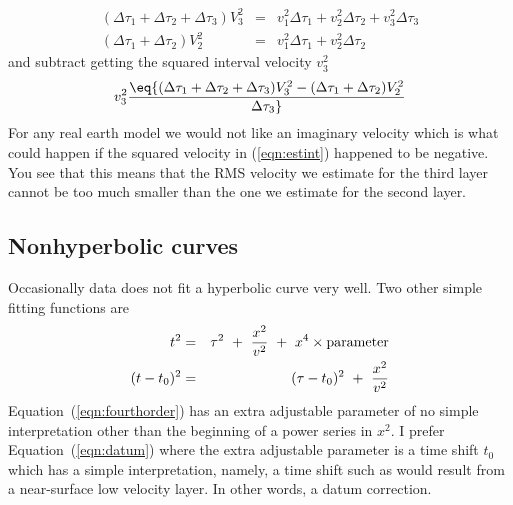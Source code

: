 \begin{eqnarray}
\label{eqn:next3}
                                    (\Delta\tau_1 + \Delta\tau_2 +\Delta\tau_3)
V_3^2 &=& v_1^2\Delta\tau_1+ v_2^2\Delta\tau_2 +v_3^2\Delta\tau_3  
\\
\label{eqn:next2}
                                    (\Delta\tau_1 + \Delta\tau_2)
V_2^2 &=& v_1^2\Delta\tau_1+ v_2^2\Delta\tau_2 
\end{eqnarray}
and subtract getting the squared interval velocity $v_3^2$
\begin{equation}
v_3^2 \eq {
        (\Delta\tau_1 + \Delta\tau_2 +\Delta\tau_3) V_3^2  -
        (\Delta\tau_1 + \Delta\tau_2              ) V_2^2
        \over
        \Delta\tau_3}
\label{eqn:estint}
\end{equation}
For any real earth model we would not like an imaginary velocity
which is what could happen if the squared velocity in (\ref{eqn:estint})
happened to be negative.
You see that this means that the RMS velocity we estimate
for the third layer cannot be too much smaller than the one we
estimate for the second layer.

\par

\subsection{Nonhyperbolic curves}
Occasionally data does not fit a hyperbolic curve very well.
Two other simple fitting functions are
\begin{eqnarray}
\label{eqn:fourthorder}
t^2              &=& \tau^2 \ +\ { x^2   \over  v^2 } \ 
                                                +\ x^4 \times {\rm parameter}
\\
\label{eqn:datum}
(t-t_0)^2        &=& (\tau-t_0)^2 \ +\ { x^2   \over  v^2 } 
\end{eqnarray}
Equation~(\ref{eqn:fourthorder}) has an extra adjustable parameter
of no simple interpretation other than the beginning of a power series in $x^2$.
I prefer Equation~(\ref{eqn:datum}) where the extra adjustable parameter
is a time shift $t_0$ which has a simple interpretation,
namely, a time shift
such as would result from a near-surface low velocity layer.
In other words, a datum correction.

